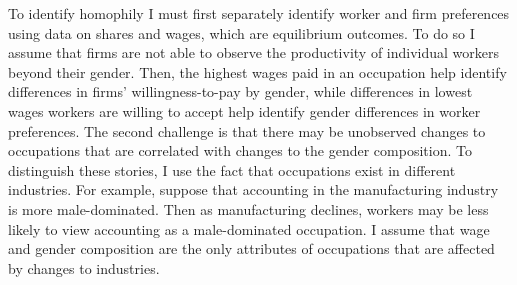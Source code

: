 \documentclass[12pt]{article}
\begin{document}
To identify homophily I must first separately identify worker and firm preferences using data on shares and wages, which are equilibrium outcomes. To do so I assume that firms are not able to observe the productivity of individual workers beyond their gender. Then, the highest wages paid in an occupation help identify differences in firms' willingness-to-pay by gender, while differences in lowest wages workers are willing to accept help identify gender differences in worker preferences. The second challenge is that there may be unobserved changes to occupations that are correlated with changes to the gender composition. To distinguish these stories, I use the fact that occupations exist in different industries. For example, suppose that accounting in the manufacturing industry is more male-dominated. Then as manufacturing declines, workers may be less likely to view accounting as a male-dominated occupation. I assume that wage and gender composition are the only attributes of occupations that are affected by changes to industries.








\end{document}
